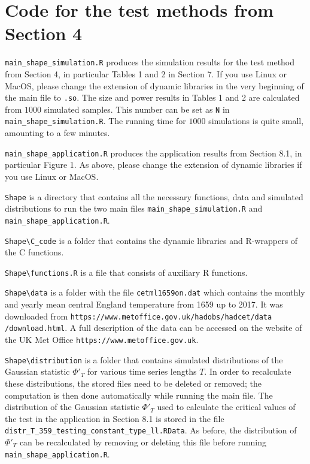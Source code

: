 \documentclass[a4paper,12pt]{article}
\begin{document}
\newpage
\section*{Code for the test methods from Section 4}


\setlength{\parskip}{0.3cm}
\everypar{\hangafter=1\hangindent=1.45cm\relax}

\verb|main_shape_simulation.R| \hspace{1pt} produces the simulation results for the test method from Section 4, in particular Tables 1 and 2 in Section 7. If you use Linux or MacOS, please change the extension of dynamic libraries in the very beginning of the main file to \verb|.so|. The size and power results in Tables 1 and 2 are calculated from $1000$ simulated samples. This number can be set as \verb|N| in \verb|main_shape_simulation.R|. The running time for $1000$ simulations is quite small, amounting to a few minutes. 

\verb|main_shape_application.R| \hspace{1pt} produces the application results from Section 8.1, in particular Figure 1. As above, please change the extension of dynamic libraries if you use Linux or MacOS.

\verb|Shape| \hspace{1pt} is a directory that contains all the necessary functions, data and simulated distributions to run the two main files \verb|main_shape_simulation.R| and \verb|main_shape_application.R|.

\verb|Shape\C_code| \hspace{1pt} is a folder that contains the dynamic libraries and R-wrappers of the C functions.

\verb|Shape\functions.R| \hspace{1pt} is a file that consists of auxiliary R functions.

\verb|Shape\data| \hspace{1pt} is a folder with the file \verb|cetml1659on.dat| which contains the monthly and yearly mean central England temperature from 1659 up to 2017. It was downloaded from \verb|https://www.metoffice.gov.uk/hadobs/hadcet/data| \verb|/download.html|. A full description of the data can be accessed on the website of the UK Met Office \verb|https://www.metoffice.gov.uk|. 

\verb|Shape\distribution| \hspace{1pt} is a folder that  contains simulated distributions of the Gaussian statistic $\Phi'_{T}$ for various time series lengths $T$. In order to recalculate these distributions, the stored files need to be deleted or removed; the computation is then done automatically while running the main file. The distribution of the Gaussian statistic $\Phi'_T$ used to calculate the critical values of the test in the application in Section 8.1 is stored in the file \verb|distr_T_359_testing_constant_type_ll.RData|. As before, the distribution of $\Phi'_T$ can be recalculated by removing or deleting this file before running \verb|main_shape_application.R|.  
\vspace{0.2cm}
\end{document}
